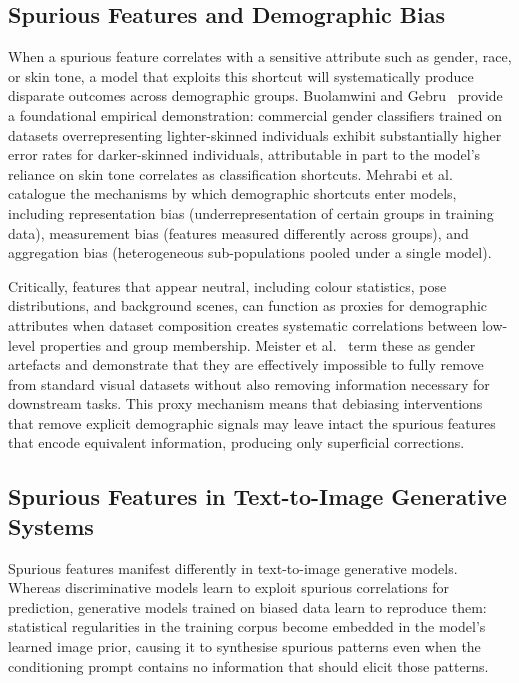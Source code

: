 \subsection*{Spurious Features and Demographic Bias}
\label{subsec:spurious_demographic}

When a spurious feature correlates with a sensitive attribute such as gender, race, or skin
tone, a model that exploits this shortcut will systematically produce disparate outcomes
across demographic groups. Buolamwini and Gebru~\cite{Buolamwini_2018_GenderShades} provide a foundational empirical
demonstration: commercial gender classifiers trained on datasets overrepresenting
lighter-skinned individuals exhibit substantially higher error rates for darker-skinned
individuals, attributable in part to the model's reliance on skin tone correlates as classification
shortcuts. Mehrabi et al.~\cite{Mehrabi_2022_SurveyBiasFairnessMachine} catalogue the mechanisms by which
demographic shortcuts enter models, including representation bias (underrepresentation of
certain groups in training data), measurement bias (features measured differently across
groups), and aggregation bias (heterogeneous sub-populations pooled under a single model).

Critically, features that appear neutral, including colour statistics, pose distributions,
and background scenes, can function as proxies for demographic attributes when dataset
composition creates systematic correlations between low-level properties and group
membership. Meister et al.~\cite{Meister_2023_GenderArtifactsinVisualDatasets} term these as
gender artefacts and demonstrate that they are effectively impossible to fully remove from
standard visual datasets without also removing information necessary for downstream tasks.
This proxy mechanism means that debiasing interventions that remove explicit demographic
signals may leave intact the spurious features that encode equivalent
information, producing only superficial corrections.

\subsection*{Spurious Features in Text-to-Image Generative Systems}
\label{subsec:spurious_generative}

Spurious features manifest differently in text-to-image generative models. Whereas
discriminative models learn to exploit spurious correlations for prediction, generative
models trained on biased data learn to reproduce them: statistical regularities in the
training corpus become embedded in the model's learned image prior, causing it to
synthesise spurious patterns  even when the conditioning prompt contains no information that should elicit those patterns.


